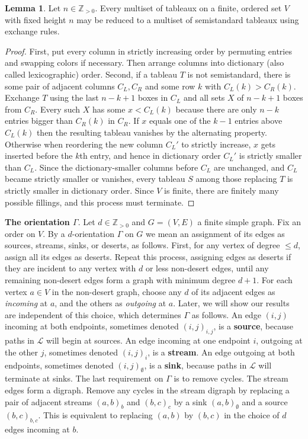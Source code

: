 \documentclass[11pt,letterpaper]{amsart}
\theoremstyle{definition}
\newtheorem{lemma}{Lemma}
\begin{document}
\begin{lemma}\label{lemma:semistandard-tableaux-span}
    Let $n \in \mathbb{Z}_{>0}$. Every multiset of tableaux on a finite, ordered set $V$ with fixed height $n$ may be reduced to a multiset of semistandard tableaux using exchange rules.
\end{lemma}

\begin{proof}
    First, put every column in strictly increasing order by permuting entries and swapping colors if necessary. Then arrange columns into dictionary (also called lexicographic) order. Second, if a tableau $T$ is not semistandard, there is some pair of adjacent columns $C_L,C_R$ and some row $k$ with $C_L(k) > C_R(k)$. Exchange $T$ using the last $n-k+1$ boxes in $C_L$ and all sets $X$ of $n-k+1$ boxes from $C_R$. Every such $X$ has some $x < C_L(k)$ because there are only $n-k$ entries bigger than $C_R(k)$ in $C_R$. If $x$ equals one of the $k-1$ entries above $C_L(k)$ then the resulting tableau vanishes by the alternating property. Otherwise when reordering the new column $C_L'$ to strictly increase, $x$ gets inserted before the $k$th entry, and hence in dictionary order $C_L'$ is strictly smaller than $C_L$. Since the dictionary-smaller columns before $C_L$ are unchanged, and $C_L$ became strictly smaller or vanishes, every tableau $S$ among those replacing $T$ is strictly smaller in dictionary order. Since $V$ is finite, there are finitely many possible fillings, and this process must terminate.
\end{proof}


\textbf{The orientation $\Gamma$}. Let $d \in \mathbb{Z}_{>0}$ and $G=(V,E)$ a finite simple graph. Fix an order on $V$. By a $d$-orientation $\Gamma$ on $G$ we mean an assignment of its edges as sources, streams, sinks, or deserts, as follows. First, for any vertex of degree $\leq d$, assign all its edges as deserts. Repeat this process, assigning edges as deserts if they are incident to any vertex with $d$ or less non-desert edges, until any remaining non-desert edges form a graph with minimum degree $d+1$. For each vertex $a \in V$ in the non-desert graph, choose any $d$ of its adjacent edges as \textit{incoming} at $a$, and the others as \textit{outgoing} at $a$. Later, we will show our results are independent of this choice, which determines $\Gamma$ as follows. 
An edge $(i,j)$ incoming at both endpoints, sometimes denoted $(i,j)_{i,j}$, is a \textbf{source}, because paths in $\mathcal{L}$ will begin at sources. An edge incoming at one endpoint $i$, outgoing at the other $j$, sometimes denoted $(i,j)_i$, is a \textbf{stream}. An edge outgoing at both endpoints, sometimes denoted $(i,j)_\emptyset$, is a \textbf{sink}, because paths in $\mathcal{L}$ will terminate at sinks. The last requirement on $\Gamma$ is to remove cycles. The stream edges form a digraph. Remove any cycles in the stream digraph by replacing a pair of adjacent streams $(a,b)_b$ and $(b,c)_c$ by a sink $(a,b)_\emptyset$ and a source $(b,c)_{b,c}$. This is equivalent to replacing $(a,b)$ by $(b,c)$ in the choice of $d$ edges incoming at $b$.
\end{document}
